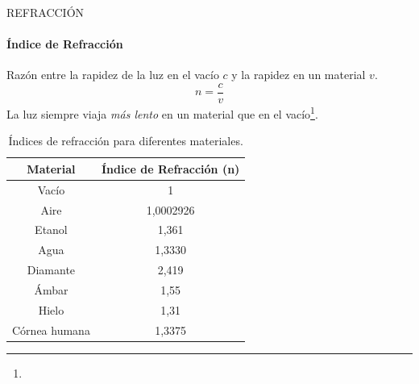\begin{frame}{REFRACCIÓN}
  \framesubtitle{Índice de Refracción}
  Razón entre la rapidez de la luz en el vacío $c$ y la rapidez en un material $v$.
  \begin{equation}
    n = \frac{c}{v}
  \end{equation}
  La luz siempre viaja \textit{más lento} en un material que en el vacío\footnote{}.

  \begin{table}[H]
    \centering
    \caption{Índices de refracción para diferentes materiales.}
    \begin{tabular}{cc}
    \hline
    \textbf{Material} & \textbf{Índice de Refracción (n)} \\ \hline
    Vacío             & 1                                 \\
    Aire              & 1,0002926                         \\
    Etanol            & 1,361                             \\
    Agua              & 1,3330                            \\
    Diamante          & 2,419                             \\
    Ámbar             & 1,55                              \\
    Hielo             & 1,31                              \\
    Córnea humana     & 1,3375                            \\ \hline
    \end{tabular}
\end{table}

\end{frame}

